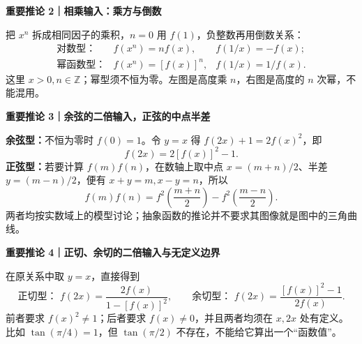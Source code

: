 \FReserve{7.5cm}
\begin{proofbox}
\textbf{\textcolor{CProof}{重要推论 2｜相乘输入：乘方与倒数}}

把 $x^n$ 拆成相同因子的乘积，$n=0$ 用 $f(1)$，负整数再用倒数关系：
\[
\begin{array}{lll}
\text{对数型：}&f(x^n)=nf(x),&f(1/x)=-f(x);\\[4pt]
\text{幂函数型：}&f(x^n)=[f(x)]^n,&f(1/x)=1/f(x).
\end{array}
\]
这里 $x>0,n\in\mathbb Z$；幂型须不恒为零。左图是高度乘 $n$，右图是高度的 $n$ 次幂，不能混用。
\end{proofbox}

\FReserve{7.5cm}
\begin{proofbox}
\textbf{\textcolor{CProof}{重要推论 3｜余弦的二倍输入，正弦的中点半差}}

\textbf{余弦型：}不恒为零时 $f(0)=1$。令 $y=x$ 得 $f(2x)+1=2f(x)^2$，即
\[\boxed{f(2x)=2[f(x)]^2-1}.\]
\textbf{正弦型：}若要计算 $f(m)f(n)$，在数轴上取中点 $x=(m+n)/2$、半差 $y=(m-n)/2$，便有 $x+y=m,x-y=n$，所以
\[\boxed{f(m)f(n)=f^2\!\left(\frac{m+n}{2}\right)-f^2\!\left(\frac{m-n}{2}\right)}.\]
两者均按实数域上的模型讨论；抽象函数的推论并不要求其图像就是图中的三角曲线。
\end{proofbox}

\FReserve{7.5cm}
\begin{proofbox}
\textbf{\textcolor{CProof}{重要推论 4｜正切、余切的二倍输入与无定义边界}}

在原关系中取 $y=x$，直接得到
\[
\text{正切型： }\boxed{f(2x)=\frac{2f(x)}{1-[f(x)]^2}},\qquad
\text{余切型： }\boxed{f(2x)=\frac{[f(x)]^2-1}{2f(x)}}.
\]
前者要求 $f(x)^2\ne1$；后者要求 $f(x)\ne0$，并且两者均须在 $x,2x$ 处有定义。比如 $\tan(\pi/4)=1$，但 $\tan(\pi/2)$ 不存在，不能给它算出一个“函数值”。
\end{proofbox}

